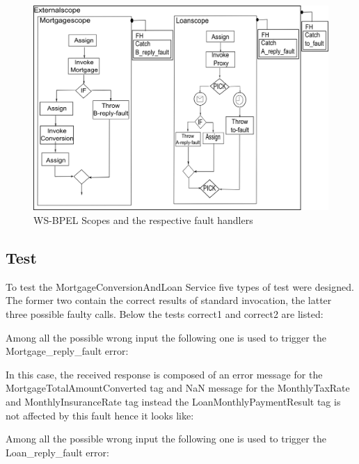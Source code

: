 \documentclass[
10pt, %
a4paper, %
oneside, %
headinclude,footinclude, %
BCOR5mm, %
]{scrartcl}
\newcommand{\xmlscript}[2]{

}
\begin{document}
\begin{figure}[tb]
\centering 
\includegraphics[width=1\columnwidth]{./pictures/APIScope.png} 
\caption[WS-BPEL Scopes]{WS-BPEL Scopes and the respective fault handlers}  
\label{fig:Scope} 
\end{figure}

\subsection{Test}

To test the MortgageConversionAndLoan Service five types of test were designed.
The former two contain the correct results of standard invocation,
the latter three possible faulty calls.
Below the tests correct1 and correct2 are listed:

\xmlscript{./code/correct1}{}
\xmlscript{./code/correct2}{}

Among all the possible wrong input the following one is used to trigger
the Mortgage\_reply\_fault error:

\xmlscript{./code/mortgagefault}{}

In this case, the received response is composed of an error message for
the MortgageTotalAmountConverted tag and NaN message for the MonthlyTaxRate
and MonthlyInsuranceRate tag instead the LoanMonthlyPaymentResult
tag is not affected by this fault hence it looks like:

\xmlscript{./code/mortgagefaultresponse}{}

Among all the possible wrong input the following one is used to trigger
the Loan\_reply\_fault error:

\xmlscript{./code/loanfault}{}
\end{document}
